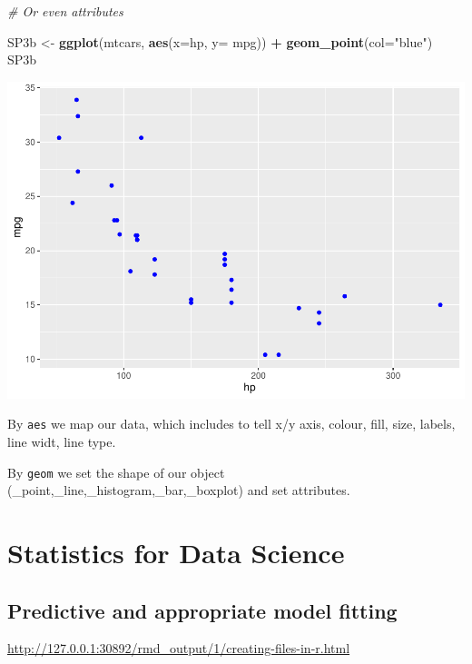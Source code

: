 \documentclass[]{report}
\newenvironment{Shaded}{\begin{snugshade}}{\end{snugshade}}
\newcommand{\KeywordTok}[1]{\textcolor[rgb]{0.13,0.29,0.53}{\textbf{#1}}}
\newcommand{\DataTypeTok}[1]{\textcolor[rgb]{0.13,0.29,0.53}{#1}}
\newcommand{\StringTok}[1]{\textcolor[rgb]{0.31,0.60,0.02}{#1}}
\newcommand{\CommentTok}[1]{\textcolor[rgb]{0.56,0.35,0.01}{\textit{#1}}}
\newcommand{\OperatorTok}[1]{\textcolor[rgb]{0.81,0.36,0.00}{\textbf{#1}}}
\newcommand{\NormalTok}[1]{#1}
\begin{document}
\begin{Shaded}
\begin{Highlighting}[]
\CommentTok{# Or even attributes}

\NormalTok{SP3b <-}\StringTok{ }\KeywordTok{ggplot}\NormalTok{(mtcars, }\KeywordTok{aes}\NormalTok{(}\DataTypeTok{x=}\NormalTok{hp, }\DataTypeTok{y=}\NormalTok{ mpg)) }\OperatorTok{+}
\StringTok{      }\KeywordTok{geom_point}\NormalTok{(}\DataTypeTok{col=}\StringTok{"blue"}\NormalTok{)}
\NormalTok{SP3b}
\end{Highlighting}
\end{Shaded}

\includegraphics{MyBook_files/figure-latex/unnamed-chunk-69-4.pdf}

By \texttt{aes} we map our data, which includes to tell x/y axis,
colour, fill, size, labels, line widt, line type.

By \texttt{geom} we set the shape of our object
(\_point,\_line,\_histogram,\_bar,\_boxplot) and set attributes.

\part{Statistics for Data
Science}\label{part-statistics-for-data-science}

\chapter{Predictive and appropriate model
fitting}\label{predictive-and-appropriate-model-fitting}

\url{http://127.0.0.1:30892/rmd_output/1/creating-files-in-r.html}
\end{document}
